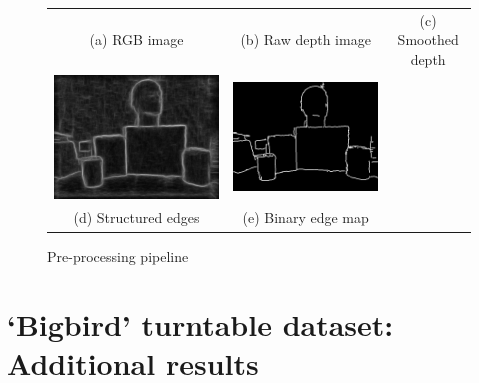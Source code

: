 \documentclass[10pt,onecolumn,letterpaper]{article}
\begin{document}
\begin{figure}[b]
\begin{tabular}{ccc}
    (a) RGB image & (b) Raw depth image & (c) Smoothed depth \\
    \includegraphics[width=\preprocesssubwidth]{process/preprocess_d} &
    \includegraphics[width=\preprocesssubwidth]{process/preprocess_e} & \\
    (d) Structured edges &
    (e) Binary edge map & \\
\end{tabular}
\vspace{5pt}
\caption{\small Pre-processing pipeline}
\label{fig:preproc}
\end{figure}


\newpage
\section{`Bigbird' turntable dataset: Additional results}
\end{document}
